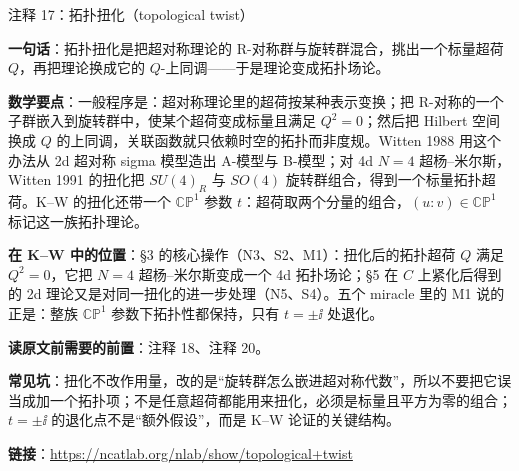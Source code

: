\begin{kcard}{注释 17：拓扑扭化（topological twist）}

\textbf{一句话}：拓扑扭化是把超对称理论的 R-对称群与旋转群混合，挑出一个标量超荷 $Q$，再把理论换成它的 $Q$-上同调——于是理论变成拓扑场论。

\textbf{数学要点}：一般程序是：超对称理论里的超荷按某种表示变换；把 R-对称的一个子群嵌入到旋转群中，使某个超荷变成标量且满足 $Q^2=0$；然后把 Hilbert 空间换成 $Q$ 的上同调，关联函数就只依赖时空的拓扑而非度规。Witten 1988 用这个办法从 2d 超对称 sigma 模型造出 A-模型与 B-模型；对 4d $N=4$ 超杨--米尔斯，Witten 1991 的扭化把 $SU(4)_R$ 与 $SO(4)$ 旋转群组合，得到一个标量拓扑超荷。K--W 的扭化还带一个 $\mathbb{CP}^1$ 参数 $t$：超荷取两个分量的组合，$(u:v)\in\mathbb{CP}^1$ 标记这一族拓扑理论。

\textbf{在 K--W 中的位置}：§3 的核心操作（N3、S2、M1）：扭化后的拓扑超荷 $Q$ 满足 $Q^2=0$，它把 $N=4$ 超杨--米尔斯变成一个 4d 拓扑场论；§5 在 $C$ 上紧化后得到的 2d 理论又是对同一扭化的进一步处理（N5、S4）。五个 miracle 里的 M1 说的正是：整族 $\mathbb{CP}^1$ 参数下拓扑性都保持，只有 $t=\pm\ii$ 处退化。

\textbf{读原文前需要的前置}：注释 18、注释 20。

\textbf{常见坑}：扭化不改作用量，改的是“旋转群怎么嵌进超对称代数”，所以不要把它误当成加一个拓扑项；不是任意超荷都能用来扭化，必须是标量且平方为零的组合；$t=\pm\ii$ 的退化点不是“额外假设”，而是 K--W 论证的关键结构。

\noindent\textbf{链接}：\url{https://ncatlab.org/nlab/show/topological+twist}
\end{kcard}

